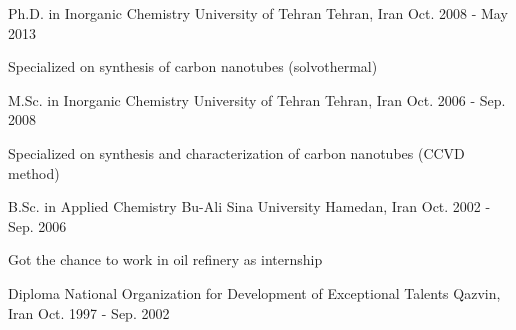 

\begin{cventries}

    \cventry
    {Ph.D. in Inorganic Chemistry} %
    {University of Tehran} %
    {Tehran, Iran} %
    {Oct. 2008 - May 2013} %
    {
      \begin{cvitems} %
        \item {Specialized on synthesis of carbon nanotubes (solvothermal)}
      \end{cvitems}
    }
    
\cventry
{M.Sc. in Inorganic Chemistry} %
{University of Tehran} %
{Tehran, Iran} %
{Oct. 2006 - Sep. 2008} %
{
  \begin{cvitems} %
    \item {Specialized on synthesis and characterization of carbon nanotubes (CCVD method)}
  \end{cvitems}
}
  
\cventry
{B.Sc. in Applied Chemistry} %
{Bu-Ali Sina University} %
{Hamedan, Iran} %
{Oct. 2002 - Sep. 2006} %
{
  \begin{cvitems} %
    \item {Got the chance to work in oil refinery as internship}
  \end{cvitems}
}

    \cventry
        {Diploma} %
        {National Organization for Development of Exceptional Talents} %
        {Qazvin, Iran} %
        {Oct. 1997 - Sep. 2002}{} %
\end{cventries}
